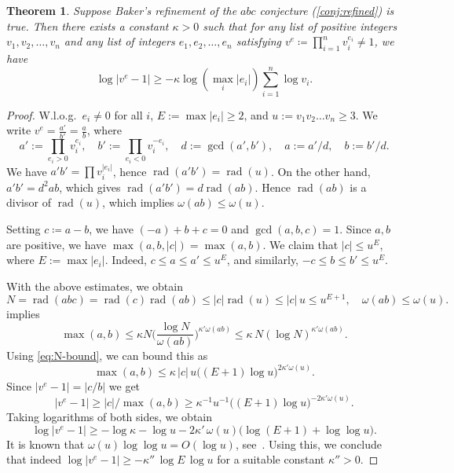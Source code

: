 \documentclass[10pt,a4paper]{article}
\newtheorem{theorem}{Theorem}[section]
\theoremstyle{definition}
\DeclareMathOperator{\rad}{rad}
\numberwithin{equation}{section}
\begin{document}
\begin{theorem}
\label{thm:abc-bound}
Suppose Baker's refinement of the $abc$ conjecture (\cref{conj:refined}) is true.
Then there exists a constant $\kappa>0$ such that for any list of positive integers $v_1,v_2,\dots,v_n$
and any list of integers $e_1,e_2,\dots,e_n$ satisfying $v^e\coloneqq\prod_{i=1}^n v_i^{e_i}\neq 1$, we have
\[
 \log|v^e-1| \geq -\kappa \log(\max_i|e_i|)\sum_{i=1}^n \log v_i.
\]
\end{theorem}

\begin{proof}
W.l.o.g.\  $e_i\neq 0$ for all $i$,
$E := \max |e_i| \ge 2$, and $u := v_1v_2\dots v_n \ge 3$.
We write
$v^e= \frac{a'}{b'} = \frac{a}{b}$,
where
\[
   a' := \prod_{e_i> 0} v_i^{e_i}, \quad
   b' := \prod_{e_i<0} v_i^{-e_i} , \quad
 d:= \gcd(a', b'), \quad
 a := a'/d, \quad
b:= b'/d .
\]
We have
$a'b' = \prod v_i^{|e_i|}$, hence
$\rad(a'b') = \rad(u)$.
On the other hand,
$a'b'=d^2 ab$, which gives
$\rad(a'b') = d \rad(ab)$.
Hence $\rad(ab)$ is a divisor of $\rad(u)$,
which implies
$\omega(ab) \le \omega(u)$.

Setting $c\coloneqq a-b$, we have
$(-a)+b+c=0$ and $\gcd(a,b,c)=1$.
Since $a,b$ are positive, we have $\max(a,b,|c|)=\max(a,b)$.
We claim that $|c| \le u^E$,
where $ E := \max |e_i|$.
Indeed,
$c \le a \le a' \le u^E$,
and similarly,
$-c \le b \le b' \le u^E$.

With the above estimates, we obtain
\begin{equation}\label{eq:N-bound}
 N = \rad(abc) = \rad(c) \rad(ab) \le |c| \rad(u) \le |c|\, u \le u^{E +1} , \quad \omega(ab) \le \omega(u) .
\end{equation}
 implies
\[
 \max(a,b)\leq \kappa N \Big(\frac{\log N}{\omega(ab)}\Big)^{\kappa'\omega(ab)}\leq
  \kappa\, N (\log N)^{\kappa'\omega(ab)}.
\]
Using \cref{eq:N-bound},
we can bound this as
\[
 \max(a,b)\leq \kappa\, |c|\, u \big((E+1)\log u \big)^{2\kappa' \omega(u)}.
\]
Since $|v^e-1|=|c/b|$ we get
\[
 |v^e-1|\geq |c|/\max(a,b) \geq  \kappa^{-1} u^{-1} \big((E+1)\log u \big)^{-2\kappa' \omega(u)}.
\]
Taking logarithms of both sides, we obtain
\[
 \log|v^e-1| \geq -\log\kappa -\log u - 2\kappa' \, \omega(u)\big(\log(E+1) + \log \log u \big) .
\]
It is known that $\omega(u)\log\log u = O(\log u)$, see~\cite[\S 22.10]{hardy-wright:08}.
Using this, we conclude that indeed
$\log|v^e-1| \geq -\kappa''\, \log E \, \log u$
for a suitable constant $\kappa''>0$.
\end{proof}
\end{document}
